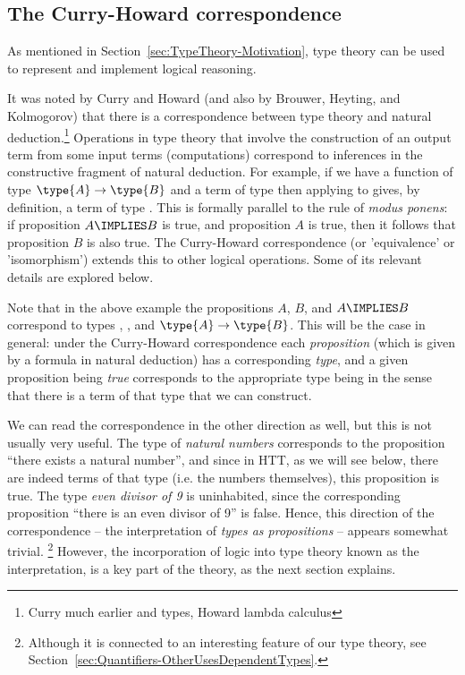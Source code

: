 \subsection{The Curry-Howard correspondence}
\label{sec:TypeTheory-CurryHoward}

As mentioned in Section~\ref{sec:TypeTheory-Motivation}, type theory can be used to represent and implement logical reasoning. 

It was noted by Curry and Howard (and also by Brouwer, Heyting, and Kolmogorov) that there is a correspondence between type theory and natural deduction.\footnote{Curry much earlier and types, Howard lambda calculus} Operations in type theory that involve the construction of an output term from some input terms (computations) correspond to inferences in the constructive fragment of natural deduction. 
For example, if we have a function  of type $\type{A}\to\type{B}$ and a term  of type  then applying  to  gives, by definition, a term of type .  This is formally parallel to the rule of \emph{modus ponens}: if proposition $A \IMPLIES B$ is true, and proposition $A$ is true, then it follows that proposition $B$ is also true.  The Curry-Howard correspondence (or 'equivalence' or 'isomorphism') extends this to other logical operations.  Some of its relevant details are explored below.

Note that in the above example the propositions $A$, $B$, and $A \IMPLIES B$ correspond to types , , and $\type{A}\to\type{B}$. This will be the case in general: under the Curry-Howard correspondence each \emph{proposition} (which is given by a formula in natural deduction) has a corresponding \emph{type}, and a given proposition being \emph{true} corresponds to the appropriate type being  in the sense that there is a term of that type that we can construct.

We can read the correspondence in the other direction as well, but this is not usually very useful. The type of \emph{natural numbers} corresponds to the proposition ``there exists a natural number'', and since in HTT, as we will see below, there are indeed terms of that type (i.e. the numbers themselves), this proposition is true. The type \emph{even divisor of 9} is uninhabited, since the corresponding proposition ``there is an even divisor of 9'' is false. Hence, this direction of the correspondence -- the interpretation of \emph{types as propositions} -- appears somewhat trivial. \footnote{
Although it is connected to an interesting feature of our type theory, see Section~\ref{sec:Quantifiers-OtherUsesDependentTypes}.
}  
However, the incorporation of logic into type theory known as the  interpretation, is a key part of the theory, as the next section explains.

